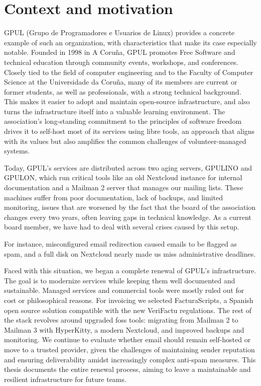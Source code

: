 \section{Context and motivation}

GPUL (Grupo de Programadores e Usuarios de Linux) \cite{gpul-web} provides a concrete example of such an organization, with characteristics that make its case especially notable. Founded in 1998 in A Coruña, GPUL promotes Free Software and technical education through community events, workshops, and conferences. Closely tied to the field of computer engineering and to the Faculty of Computer Science at the Universidade da Coruña, many of its members are current or former students, as well as professionals, with a strong technical background. This makes it easier to adopt and maintain open-source infrastructure, and also turns the infrastructure itself into a valuable learning environment. The association's long-standing commitment to the principles of software freedom drives it to self-host most of its services using libre tools, an approach that aligns with its values but also amplifies the common challenges of volunteer-managed systems.

Today, GPUL's services are distributed across two aging servers, GPULINO and GPULON, which run critical tools like an old Nextcloud instance for internal documentation and a Mailman 2 server that manages our mailing lists. These machines suffer from poor documentation, lack of backups, and limited monitoring, issues that are worsened by the fact that the board of the association changes every two years, often leaving gaps in technical knowledge. As a current board member, we have had to deal with several crises caused by this setup.

For instance, misconfigured email redirection caused emails to be flagged as spam, and a full disk on Nextcloud nearly made us miss administrative deadlines.

Faced with this situation, we began a complete renewal of GPUL's infrastructure. The goal is to modernize services while keeping them well documented and sustainable. Managed services and commercial tools were mostly ruled out for cost or philosophical reasons. For invoicing we selected FacturaScripts\cite{facturascripts-antifraude}, a Spanish open source solution compatible with the new VeriFactu regulations\cite{boe-a-2024-22138}. The rest of the stack revolves around upgraded \gls{foss} tools: migrating from Mailman 2 to Mailman 3 with HyperKitty\cite{hyperkitty-web}, a modern Nextcloud, and improved backups and monitoring. We continue to evaluate whether email should remain self-hosted or move to a trusted provider, given the challenges of maintaining sender reputation and ensuring deliverability amidst increasingly complex anti-spam measures. This thesis documents the entire renewal process, aiming to leave a maintainable and resilient infrastructure for future teams.

